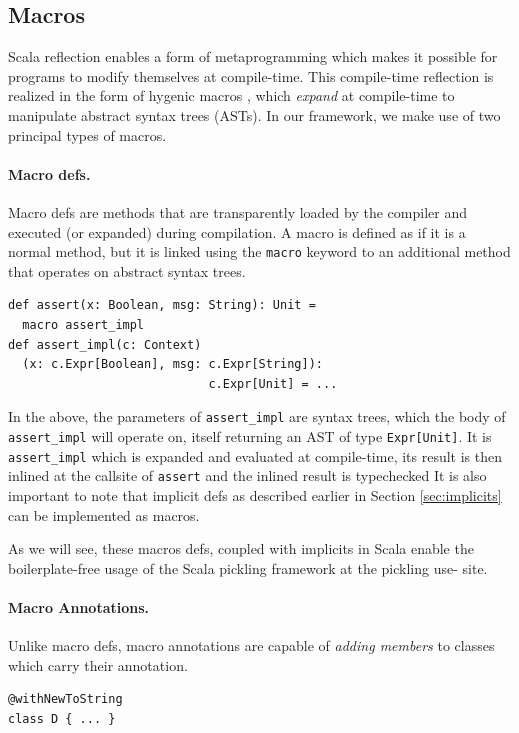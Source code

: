 \documentclass[preprint,10pt]{sigplanconf}
\theoremstyle{definition}
\theoremstyle{definition}
\begin{document}
\subsection{Macros}
\label{sec:macros}

Scala reflection enables a form of metaprogramming which makes it possible for
programs to modify themselves at compile-time. This compile-time reflection is
realized in the form of hygenic macros \cite{Burmako2012}, which {\em expand}
at compile-time to manipulate abstract syntax trees (ASTs). In our framework, we make
use of two principal types of macros.

\paragraph{Macro defs.} Macro defs are methods that are transparently loaded
by the compiler and executed (or expanded) during compilation. A macro is
defined as if it is a normal method, but it is linked using the \verb|macro|
keyword to an additional method that operates on abstract syntax trees.

\begin{lstlisting}
def assert(x: Boolean, msg: String): Unit =
  macro assert_impl
def assert_impl(c: Context)
  (x: c.Expr[Boolean], msg: c.Expr[String]):
                            c.Expr[Unit] = ...
\end{lstlisting}

In the above, the parameters of \verb|assert_impl| are syntax
trees, which the body of \verb|assert_impl| will operate on, itself returning
an AST of type \verb|Expr[Unit]|. It is \verb|assert_impl| which is
expanded and evaluated at compile-time, its result is then inlined at the
callsite of \verb|assert| and the inlined result is typechecked
It is also important to note that implicit defs as described earlier
in Section \ref{sec:implicits} can be implemented as macros.

As we will see, these macros defs, coupled with implicits in Scala enable the
boilerplate-free usage of the Scala pickling framework at the pickling use-
site.

\paragraph{Macro Annotations.} Unlike macro defs, macro annotations are capable
of {\em adding members} to classes which carry their annotation.

\begin{lstlisting}
@withNewToString
class D { ... }
\end{lstlisting}
\end{document}
